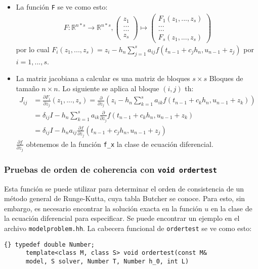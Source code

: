 \documentclass[a4paper,11pt]{article}
\theoremstyle{definition}
\begin{document}
\begin{itemize}
\item La función \lstinline{F} se ve como esto:
  \begin{align*}
    F: \mathbb{R}^{n*s} \to \mathbb{R}^{n*s}, \left( \begin{array}{c}z_1 \\...\\...\\z_s\end{array} \right) \mapsto \left( \begin{array}{c}F_1(z_1,...,z_s)\\...\\...\\F_s(z_1,...,z_s)\end{array} \right)
  \end{align*}
  por lo cual $F_i(z_1,...,z_s) = z_i-h_n \sum_{j=1}^s
  a_{ij}f(t_{n-1}+c_jh_n, u_{n-1}+z_j)$ por $i = 1,...,s$.

\item La matriz jacobiana a calcular es una matriz de bloques
  $s\times s$ Bloques de tamaño $n \times n$. Lo siguiente se aplica al bloque $ (i, j) $ th:
  \begin{align}
    J_{ij} &= \frac{\partial F_i}{\partial z_j}(z_1,...,z_s) = \frac{\partial}{\partial z_j}(z_i - h_n \sum_{k=1}^s a_{ik}f(t_{n-1}+c_kh_n, u_{n-1}+z_k)) \\
           &= \delta_{ij}I-h_n \sum_{k=1}^s a_{ik} \frac{\partial}{\partial z_j}f(t_{n-1}+c_kh_n, u_{n-1}+z_k)\\
           &= \delta_{ij}I-h_n a_{ij} \frac{\partial f}{\partial z_j}(t_{n-1}+c_jh_n, u_{n-1}+z_j)
  \end{align}
  $ \frac{\partial f}{\partial z_j}$ obtenemos de la función \lstinline{f_x} la clase de ecuación diferencial.
\end{itemize}

\subsubsection{Pruebas de orden de coherencia con \lstinline{void ordertest}}

Esta función se puede utilizar para determinar el orden de consistencia de un método general 
de Runge-Kutta, cuya tabla Butcher se conoce. Para esto, sin embargo, es necesario encontrar 
la solución exacta en la función $u$ en la clase de la ecuación diferencial
para especificar. Se puede encontrar un ejemplo en el archivo
\lstinline{modelproblem.hh}.  La cabecera funcional de
\lstinline{ordertest} se ve como esto:
{\footnotesize{\begin{lstlisting}{} typedef double Number;
      template<class M, class S> void ordertest(const M&
      model, S solver, Number T, Number h_0, int L)
    \end{lstlisting}}}
\end{document}

